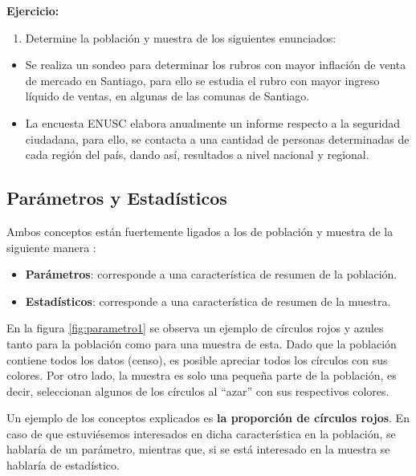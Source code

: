 \documentclass[
]{book}
\providecommand{\tightlist}{%
  \setlength{\itemsep}{0pt}\setlength{\parskip}{0pt}}
\begin{document}
\textbf{Ejercicio:}

\begin{enumerate}
\def\labelenumi{\arabic{enumi}.}
\tightlist
\item
  Determine la población y muestra de los siguientes enunciados:
\end{enumerate}

\begin{itemize}
\tightlist
\item
  Se realiza un sondeo para determinar los rubros con mayor inflación de venta de mercado en Santiago, para ello se estudia el rubro con mayor ingreso líquido de ventas, en algunas de las comunas de Santiago.
\item
  La encuesta ENUSC elabora anualmente un informe respecto a la seguridad ciudadana, para ello, se contacta a una cantidad de personas determinadas de cada región del país, dando así, resultados a nivel nacional y regional.
\end{itemize}

\hypertarget{paruxe1metros-y-estaduxedsticos}{%
\subsection{Parámetros y Estadísticos}\label{paruxe1metros-y-estaduxedsticos}}

Ambos conceptos están fuertemente ligados a los de población y muestra de la siguiente manera \citep[página 83]{anderson}:

\begin{itemize}
\tightlist
\item
  \textbf{Parámetros}: corresponde a una característica de resumen de la población.
\item
  \textbf{Estadísticos}: corresponde a una característica de resumen de la muestra.
\end{itemize}

En la figura \ref{fig:parametro1} se observa un ejemplo de círculos rojos y azules tanto para la población como para una muestra de esta. Dado que la población contiene todos los datos (censo), es posible apreciar todos los círculos con sus colores. Por otro lado, la muestra es solo una pequeña parte de la población, es decir, seleccionan algunos de los círculos al ``azar'' con sus respectivos colores.

Un ejemplo de los conceptos explicados es \textbf{la proporción de círculos rojos}. En caso de que estuviésemos interesados en dicha característica en la población, se hablaría de un parámetro, mientras que, si se está interesado en la muestra se hablaría de estadístico.
\end{document}
